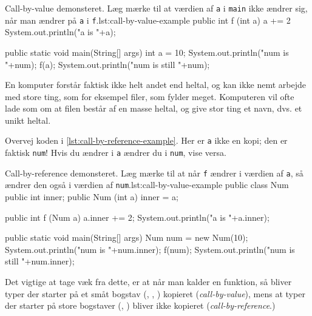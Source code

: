         \begin{JavaCode}{Call-by-value demonsteret. Læg mærke til at værdien af \texttt{a} i \texttt{main} ikke ændrer sig, når man ændrer på \texttt{a} i \texttt{f}.}{lst:call-by-value-example}
            public int f (int a) {
                a += 2
                System.out.println("a is "+a);
            }

            public static void main(String[] args) {
                int a = 10;
                System.out.println("num is "+num);
                f(a);
                System.out.println("num is still "+num);
            }
        \end{JavaCode}

        En komputer forstår faktisk ikke helt andet end heltal, og kan
        ikke nemt arbejde med store ting, som for eksempel filer, som
        fylder meget. Komputeren vil ofte lade som om at filen består
        af en masse heltal, og give stor ting et navn, dvs. et unikt
        heltal.

        Overvej koden i \autoref{lst:call-by-reference-example}.
        Her er \texttt{a} ikke en kopi; den er faktisk \texttt{num}! Hvis
        du ændrer i \texttt{a} ændrer du i \texttt{num}, vise versa.

        \begin{JavaCode}{Call-by-reference demonsteret. Læg mærke til at når \texttt{f} ændrer i værdien af \texttt{a}, så ændrer den også i værdien af \texttt{num}.}{lst:call-by-value-example}
            public class Num {
                public int inner;
                public Num (int a) { inner = a; }
            }

            public int f (Num a) {
                a.inner += 2;
                System.out.println("a is "+a.inner);
            }

            public static void main(String[] args) {
                Num num = new Num(10);
                System.out.println("num is "+num.inner);
                f(num);
                System.out.println("num is still "+num.inner);
            }
        \end{JavaCode}

        Det vigtige at tage væk fra dette, er at når man kalder en
        funktion, så bliver typer der starter på et småt bogstav
        (, , ) kopieret
        (\emph{call-by-value}), mens at typer der starter på store
        bogstaver (, ) bliver ikke kopieret
        (\emph{call-by-reference}.)

